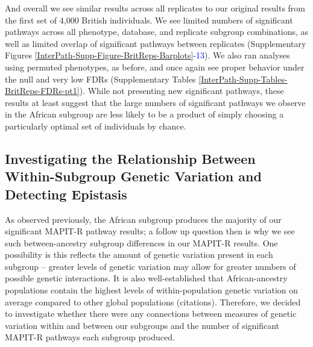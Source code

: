 \documentclass[12pt,a4paper]{article}
\begin{document}
And overall we see similar results across all replicates to our original results from the first set of 4,000 British individuals. We see limited numbers of significant pathways across all phenotype, database, and replicate subgroup combinations, as well as limited overlap of significant pathways between replicates (Supplementary Figures \ref{InterPath-Supp-Figure-BritReps-Barplots}\textcolor{blue}{-13}). We also ran analyses using permuted phenotypes, as before, and once again see proper behavior under the null and very low FDRs (Supplementary Tables \ref{InterPath-Supp-Tables-BritReps-FDRs-pt1}). While not presenting new significant pathways, these results at least suggest that the large numbers of significant pathways we observe in the African subgroup are less likely to be a product of simply choosing a particularly optimal set of individuals by chance.  

\subsection{Investigating the Relationship Between Within-Subgroup Genetic Variation and Detecting Epistasis}

As observed previously, the African subgroup produces the majority of our significant MAPIT-R pathway results; a follow up question then is why we see such between-ancestry subgroup differences in our MAPIT-R results. One possibility is this reflects the amount of genetic variation present in each subgroup -- greater levels of genetic variation may allow for greater numbers of possible genetic interactions. It is also well-established that African-ancestry populations contain the highest levels of within-population genetic variation on average compared to other global populations (citations). Therefore, we decided to investigate whether there were any connections between measures of genetic variation within and between our subgroups and the number of significant MAPIT-R pathways each subgroup produced.
\end{document}
